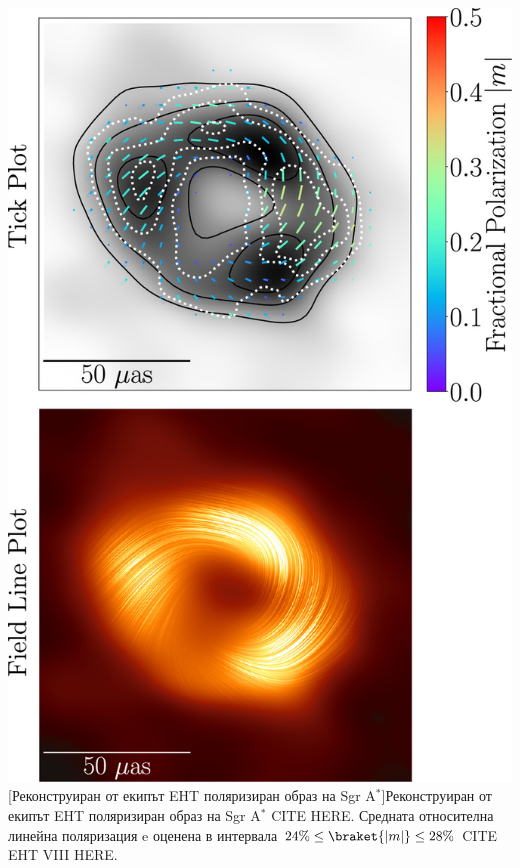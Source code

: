\begin{minipage}{14em}
	\centering
	\includegraphics[scale = 0.6]{Sgr_A_Polarization_overlay.jpg}
	[Реконструиран от екипът EHT поляризиран образ на Sgr A$^*$]{\small Реконструиран от екипът EHT поляризиран образ на Sgr A$^*$ CITE HERE. Средната относителна линейна поляризация e оценена в интервала $24\% \le \braket{|m|} \le 28\%$ CITE EHT VIII HERE.}
	\label{SgrA_Pol_Image}
\end{minipage}\\

